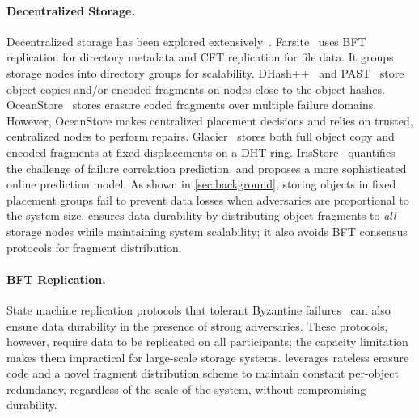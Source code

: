 \paragraph{Decentralized Storage.}
Decentralized storage has been explored extensively~\cite{xfs,farsite,oceanstore,glacier,carbonite,cfs,irisstore,past,ipfs,filecoin,ar}.
Farsite~\cite{farsite} uses BFT replication for directory metadata and CFT replication for file data.
It groups storage nodes into directory groups for scalability.
DHash++~\cite{dhash} and PAST~\cite{past} store object copies and/or encoded fragments on nodes close to the object hashes.
OceanStore~\cite{oceanstore} stores erasure coded fragments over multiple failure domains.
However, OceanStore makes centralized placement decisions and relies on trusted, centralized nodes to perform repairs.
Glacier~\cite{glacier} stores both full object copy and encoded fragments at fixed displacements on a DHT ring.
IrisStore~\cite{irisstore} quantifies the challenge of failure correlation prediction, and proposes a more sophisticated online prediction model.
As shown in \autoref{sec:background}, storing objects in fixed placement groups fail to prevent data losses when adversaries are proportional to the system size.
\sys ensures data durability by distributing object fragments to \emph{all} storage nodes while maintaining system scalability;
it also avoids BFT consensus protocols for fragment distribution.

\ifspace
\paragraph{BFT Replication.}
State machine replication protocols that tolerant Byzantine failures~\cite{pbft,algorand,hotstuff,bitcoin,ethereum} can also ensure data durability in the presence of strong adversaries.
These protocols, however, require data to be replicated on all participants;
the capacity limitation makes them impractical for large-scale storage systems.
\sys leverages rateless erasure code and a novel fragment distribution scheme to maintain constant per-object redundancy, regardless of the scale of the system, without compromising durability.
\fi

